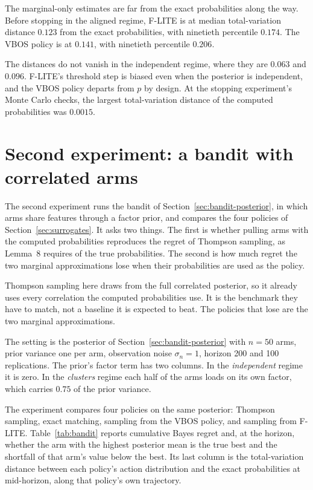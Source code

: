 \documentclass[11pt]{article}
\begin{document}
The marginal-only estimates are far from the exact probabilities along the way. Before stopping in the aligned regime, F-LITE is at median
total-variation distance $0.123$ from the exact probabilities, with ninetieth percentile $0.174$. The VBOS policy is at
$0.141$, with ninetieth percentile $0.206$.

The distances do not vanish in the independent regime, where they are
$0.063$ and $0.096$. F-LITE's threshold step is biased even when the
posterior is independent, and the VBOS policy departs from $p$ by
design. At the stopping experiment's Monte Carlo checks, the largest
total-variation distance of the computed probabilities was $0.0015$.

\section{Second experiment: a bandit with correlated arms}
\label{sec:bandit}

The second experiment runs the bandit of
Section~\ref{sec:bandit-posterior}, in which arms share
features through a factor prior, and compares the four policies of
Section~\ref{sec:surrogates}. It asks two things. The first is
whether pulling
arms with the computed probabilities reproduces the regret of Thompson
sampling, as Lemma~8 requires of the true probabilities. The second is how much regret the two marginal approximations lose
when their probabilities are used as the policy.

Thompson sampling here draws from the full correlated posterior, so it already uses every correlation the computed probabilities use. It is the benchmark they have to match, not a baseline it is expected to beat.
The policies that lose are the two marginal approximations.

The setting is the posterior of Section~\ref{sec:bandit-posterior}
with $n = 50$ arms, prior variance one per arm, observation noise
$\sigma_n = 1$, horizon 200 and 100 replications. The prior's factor
term has two columns. In the \emph{independent} regime it is zero. In the
\emph{clusters} regime each half of the arms loads on its own factor,
which carries $0.75$ of the prior variance.

The experiment compares four policies on the same posterior:
Thompson sampling, exact matching, sampling from the VBOS policy, and
sampling from F-LITE. Table~\ref{tab:bandit} reports cumulative
Bayes regret and, at the horizon, whether the arm with the highest
posterior mean is the true best and the shortfall of that arm's value
below the best. Its last column is the total-variation distance
between each policy's action distribution and the exact probabilities at mid-horizon, along that policy's own trajectory.
\end{document}
